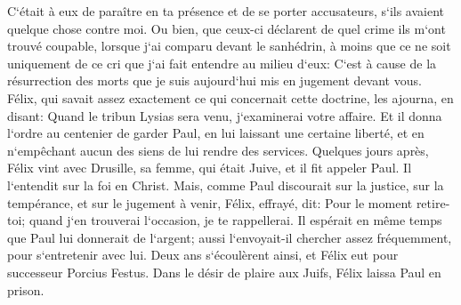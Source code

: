 \verse C`était à eux de paraître en ta présence et de se porter accusateurs, s`ils avaient quelque chose contre moi. 
\verse Ou bien, que ceux-ci déclarent de quel crime ils m`ont trouvé coupable, lorsque j`ai comparu devant le sanhédrin, 
\verse à moins que ce ne soit uniquement de ce cri que j`ai fait entendre au milieu d`eux: C`est à cause de la résurrection des morts que je suis aujourd`hui mis en jugement devant vous. 
\verse Félix, qui savait assez exactement ce qui concernait cette doctrine, les ajourna, en disant: Quand le tribun Lysias sera venu, j`examinerai votre affaire. 
\verse Et il donna l`ordre au centenier de garder Paul, en lui laissant une certaine liberté, et en n`empêchant aucun des siens de lui rendre des services. 
\verse Quelques jours après, Félix vint avec Drusille, sa femme, qui était Juive, et il fit appeler Paul. Il l`entendit sur la foi en Christ. 
\verse Mais, comme Paul discourait sur la justice, sur la tempérance, et sur le jugement à venir, Félix, effrayé, dit: Pour le moment retire-toi; quand j`en trouverai l`occasion, je te rappellerai. 
\verse Il espérait en même temps que Paul lui donnerait de l`argent; aussi l`envoyait-il chercher assez fréquemment, pour s`entretenir avec lui. 
\verse Deux ans s`écoulèrent ainsi, et Félix eut pour successeur Porcius Festus. Dans le désir de plaire aux Juifs, Félix laissa Paul en prison. 

\chapter{}

